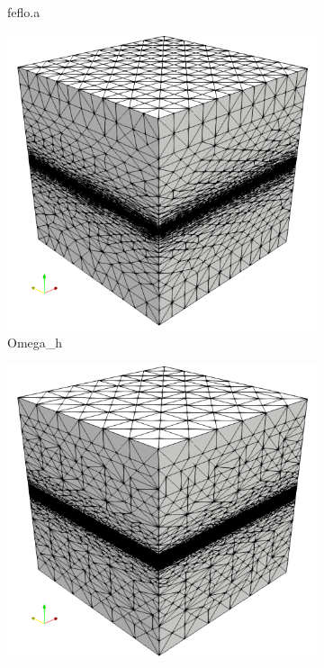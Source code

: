 \documentclass[3p,times,procedia,number]{elsarticle}
\begin{document}
\begin{figure}
\begin{subfigure}{.24\textwidth}
\caption{feflo.a}
\end{subfigure}
\begin{subfigure}{.24\textwidth}
\centering
\includegraphics[width=\textwidth]{omega_h-cube-linear.png}
\caption{Omega\_h}
\end{subfigure}
\begin{subfigure}{.24\textwidth}
\centering
\includegraphics[width=\textwidth]{refine-one-cube-linear.png}

\end{subfigure}
\end{figure}
\end{document}
